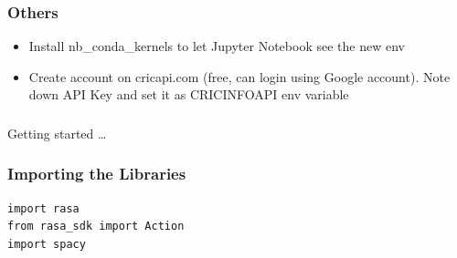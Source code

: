 \begin{frame}[fragile]\frametitle{Others}
\begin{itemize}
\item Install nb\_conda\_kernels to let Jupyter Notebook see the new env
\item Create account on cricapi.com (free, can login using Google account). Note down API Key and set it as CRICINFOAPI env variable
\end{itemize}

\end{frame}


\begin{frame}[fragile]\frametitle{}
\begin{center}
{\Large Getting started \ldots}


\end{center}
\end{frame}



 \begin{frame}[fragile]\frametitle{Importing the Libraries}

\begin{lstlisting}
import rasa
from rasa_sdk import Action
import spacy
\end{lstlisting}
\end{frame}





